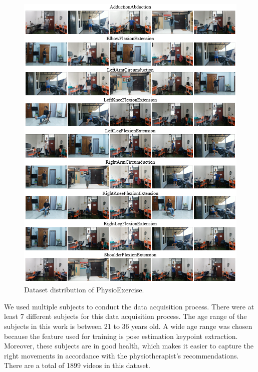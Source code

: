 \begin{figure}[h!]
	\centering
	\includegraphics[width=1\textwidth]{bab4/ar_DatasetDist.png}
	\caption{Dataset distribution of PhysioExercise.}
	\label{fig:DatasetDistribution}
\end{figure}

We used multiple subjects to conduct the data acquisition process. There were at least 7 different subjects for this data acquisition process. The age range of the subjects in this work is between 21 to 36 years old. A wide age range was chosen because the feature used for training is pose estimation keypoint extraction. Moreover, these subjects are in good health, which makes it easier to capture the right movements in accordance with the physiotherapist's recommendations. There are a total of 1899 videos in this dataset.

